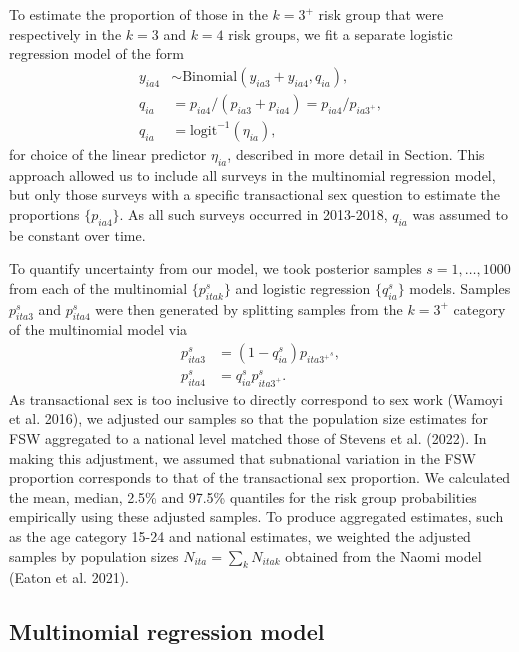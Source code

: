\documentclass[
]{article}
\begin{document}
To estimate the proportion of those in the \(k = 3^{+}\) risk group that
were respectively in the \(k = 3\) and \(k = 4\) risk groups, we fit a
separate logistic regression model of the form \begin{align}
    y_{ia4} &\sim \text{Binomial} \left( y_{ia3} + y_{ia4}, q_{ia} \right), \\
    q_{ia} &= p_{ia4} / (p_{ia3} + p_{ia4}) = p_{ia4} / p_{ia{3^+}}, \\
    q_{ia} &= \text{logit}^{-1} \left( \eta_{ia} \right), 
\end{align} for choice of the linear predictor \(\eta_{ia}\), described
in more detail in Section. This approach allowed us to include all
surveys in the multinomial regression model, but only those surveys with
a specific transactional sex question to estimate the proportions
\(\{p_{ia4}\}\). As all such surveys occurred in 2013-2018, \(q_{ia}\)
was assumed to be constant over time.

To quantify uncertainty from our model, we took posterior samples
\(s = 1, \ldots, 1000\) from each of the multinomial \(\{p_{itak}^s\}\)
and logistic regression \(\{q_{ia}^s\}\) models. Samples \(p_{ita3}^s\)
and \(p_{ita4}^s\) were then generated by splitting samples from the
\(k = 3^{+}\) category of the multinomial model via \begin{align*}
    p_{ita3}^s &= (1 - q_{ia}^s)p_{ita{3^+}^s}, \\
    p_{ita4}^s &= q_{ia}^s p_{ita{3^+}}^s.
\end{align*} As transactional sex is too inclusive to directly
correspond to sex work (Wamoyi et al. 2016), we adjusted our samples so
that the population size estimates for FSW aggregated to a national
level matched those of Stevens et al. (2022). In making this adjustment,
we assumed that subnational variation in the FSW proportion corresponds
to that of the transactional sex proportion. We calculated the mean,
median, 2.5\% and 97.5\% quantiles for the risk group probabilities
empirically using these adjusted samples. To produce aggregated
estimates, such as the age category 15-24 and national estimates, we
weighted the adjusted samples by population sizes
\(N_{ita} = \sum_k N_{itak}\) obtained from the Naomi model (Eaton et
al. 2021).

\hypertarget{multinomial-regression-model}{%
\subsection{Multinomial regression
model}\label{multinomial-regression-model}}
\end{document}
